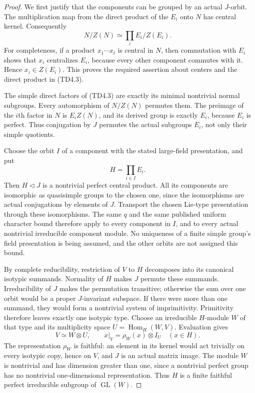 \begin{proof}
We first justify that the components can be grouped by an actual
$J$-orbit.  The multiplication map from the direct product of the
$E_i$ onto $N$ has central kernel.  Consequently
\[
                 N/Z(N)\simeq\prod_i E_i/Z(E_i).
                 \tag{TD4.3}
\]
For completeness, if a product $x_1\cdots x_t$ is central in $N$,
then commutation with $E_i$ shows that $x_i$ centralizes $E_i$,
because every other component commutes with it.  Hence
$x_i\in Z(E_i)$.  This proves the required assertion about centers
and the direct product in (TD4.3).

The simple direct factors of (TD4.3) are exactly its minimal nontrivial
normal subgroups.  Every automorphism of $N/Z(N)$ permutes them.
The preimage of the $i$th factor in $N$ is $E_i Z(N)$, and its
derived group is exactly $E_i$, because $E_i$ is perfect.
Thus conjugation by $J$ permutes the actual subgroups $E_i$, not
only their simple quotients.

Choose the orbit $I$ of a component with the stated large-field
presentation, and put
\[
                         H=\prod_{i\in I}E_i.
                         \tag{TD4.4}
\]
Then $H\triangleleft J$ is a nontrivial perfect central product.
All its components are isomorphic as quasisimple groups to the
chosen one, since the isomorphisms are actual conjugations by
elements of $J$.  Transport the chosen Lie-type presentation
through these isomorphisms.  The same $q$ and the same published
uniform character bound therefore apply to every component in
$I$, and to every actual nontrivial irreducible component module.
No uniqueness of a finite simple group's field presentation is
being assumed, and the other orbits are not assigned this bound.

By complete reducibility, restriction of $V$ to $H$ decomposes
into its canonical isotypic summands.  Normality of $H$ makes
$J$ permute these summands.  Irreducibility of $J$ makes the
permutation transitive; otherwise the sum over one orbit would
be a proper $J$-invariant subspace.  If there were more than one
summand, they would form a nontrivial system of imprimitivity.
Primitivity therefore leaves exactly one isotypic type.
Choose an irreducible $H$-module $W$ of that type and its
multiplicity space $U=\operatorname{Hom}_H(W,V)$.  Evaluation gives
\[
              V\simeq W\otimes U,\qquad
              x|_V=\rho_W(x)\otimes I_U\quad(x\in H).
              \tag{TD4.5}
\]
The representation $\rho_W$ is faithful: an element in its kernel
would act trivially on every isotypic copy, hence on $V$, and $J$
is an actual matrix image.  The module $W$ is nontrivial and has
dimension greater than one, since a nontrivial perfect group has
no nontrivial one-dimensional representation.  Thus $H$ is a
finite faithful perfect irreducible subgroup of
$\operatorname{GL}(W)$.


\end{proof}

